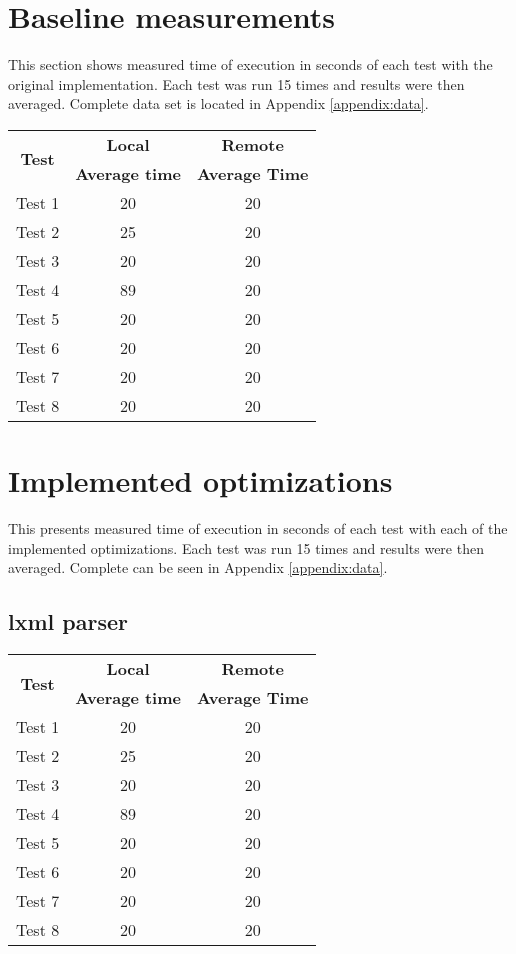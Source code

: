 \section{Baseline measurements}
This section shows measured time of execution in seconds of each test with the original implementation. Each test was run 15 times and results were then averaged. Complete data set is located in Appendix \ref{appendix:data}.

\shorthandoff{-}
\begin{center}
    \begin{tabular}{| c | c | c |}
    \hline
    \multirow{2}{*}{\textbf{Test}} & \textbf{Local} & \textbf{Remote} \\ \cline{2-3}
    & \textbf{Average time} & \textbf{Average Time} \\ \hline
    Test 1 & 20 & 20 \\ \hline
    Test 2 & 25 & 20  \\ \hline
    Test 3 & 20 & 20 \\ \hline
    Test 4 & 89 & 20 \\ \hline
    Test 5 & 20 & 20 \\ \hline
    Test 6 & 20 & 20 \\ \hline
    Test 7 & 20 & 20 \\ \hline
    Test 8 & 20 & 20 \\ \hline
    \end{tabular}
\end{center}
\shorthandon{-}

\section{Implemented optimizations}
This presents measured time of execution in seconds of each test with each of the implemented optimizations. Each test was run 15 times and results were then averaged. Complete can be seen in Appendix \ref{appendix:data}.

\subsection{lxml parser}

\shorthandoff{-}
\begin{center}
    \begin{tabular}{| c | c | c |}
    \hline
    \multirow{2}{*}{\textbf{Test}} & \textbf{Local} & \textbf{Remote} \\ \cline{2-3}
    & \textbf{Average time} & \textbf{Average Time} \\ \hline
    Test 1 & 20 & 20 \\ \hline
    Test 2 & 25 & 20  \\ \hline
    Test 3 & 20 & 20 \\ \hline
    Test 4 & 89 & 20 \\ \hline
    Test 5 & 20 & 20 \\ \hline
    Test 6 & 20 & 20 \\ \hline
    Test 7 & 20 & 20 \\ \hline
    Test 8 & 20 & 20 \\ \hline
    \end{tabular}
\end{center}
\shorthandon{-}

